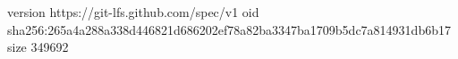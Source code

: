 version https://git-lfs.github.com/spec/v1
oid sha256:265a4a288a338d446821d686202ef78a82ba3347ba1709b5dc7a814931db6b17
size 349692
